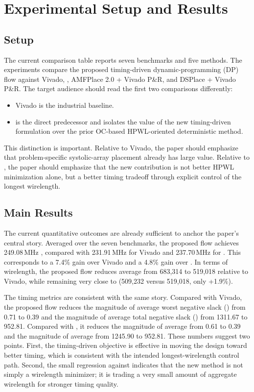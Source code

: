\section{Experimental Setup and Results}
\label{sec:exp}

\subsection{Setup}

The current comparison table reports seven benchmarks and five methods. The experiments compare the proposed timing-driven dynamic-programming (DP) flow against Vivado, \rsad, AMFPlace 2.0 + Vivado P\&R, and DSPlace + Vivado P\&R. The target audience should read the first two comparisons differently:
\begin{itemize}[leftmargin=*,topsep=2pt,itemsep=2pt]
\item Vivado is the industrial baseline.
\item \rsad is the direct predecessor and isolates the value of the new timing-driven formulation over the prior OC-based HPWL-oriented deterministic method.
\end{itemize}

This distinction is important. Relative to Vivado, the paper should emphasize that problem-specific systolic-array placement already has large value. Relative to \rsad, the paper should emphasize that the new contribution is not better HPWL minimization alone, but a better timing tradeoff through explicit control of the longest wirelength.

\subsection{Main Results}

The current quantitative outcomes are already sufficient to anchor the paper's central story. Averaged over the seven benchmarks, the proposed flow achieves 249.08\,MHz \fmax, compared with 231.91\,MHz for Vivado and 237.70\,MHz for \rsad. This corresponds to a 7.4\% \fmax gain over Vivado and a 4.8\% gain over \rsad. In terms of wirelength, the proposed flow reduces average \hpwl from 683{,}314 to 519{,}018 relative to Vivado, while remaining very close to \rsad (509{,}232 versus 519{,}018, only +1.9\%).

The timing metrics are consistent with the same story. Compared with Vivado, the proposed flow reduces the magnitude of average worst negative slack (\wns) from 0.71 to 0.39 and the magnitude of average total negative slack (\tns) from 1311.67 to 952.81. Compared with \rsad, it reduces the magnitude of average \wns from 0.61 to 0.39 and the magnitude of average \tns from 1245.90 to 952.81. These numbers suggest two points. First, the timing-driven objective is effective in moving the design toward better timing, which is consistent with the intended longest-wirelength control path. Second, the small \hpwl regression against \rsad indicates that the new method is not simply a wirelength minimizer; it is trading a very small amount of aggregate wirelength for stronger timing quality.

